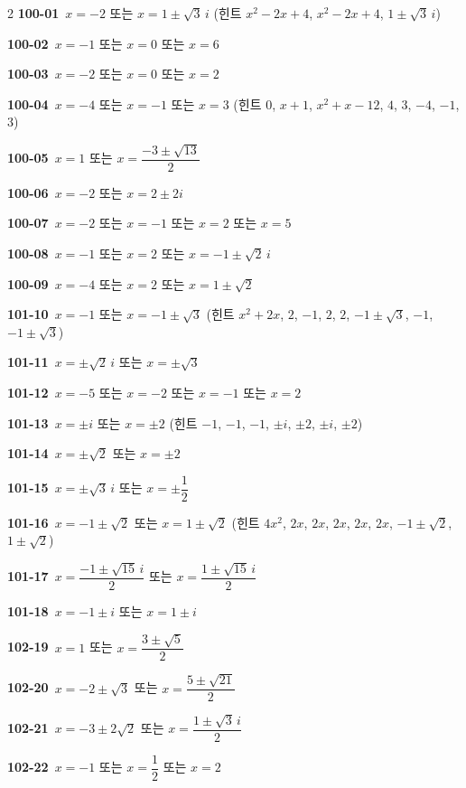 \documentclass[10pt,a4paper]{article}
\begin{document}
\begin{multicols}{2}
\noindent\textbf{100-01}\ $x=-2$ 또는 $x=1\pm\sqrt{3}\,i$ (힌트 $x^2-2x+4$, $x^2-2x+4$, $1\pm\sqrt{3}\,i$)\par
\noindent\textbf{100-02}\ $x=-1$ 또는 $x=0$ 또는 $x=6$\par
\noindent\textbf{100-03}\ $x=-2$ 또는 $x=0$ 또는 $x=2$\par
\noindent\textbf{100-04}\ $x=-4$ 또는 $x=-1$ 또는 $x=3$ (힌트 $0$, $x+1$, $x^2+x-12$, $4$, $3$, $-4$, $-1$, $3$)\par
\noindent\textbf{100-05}\ $x=1$ 또는 $x=\dfrac{-3\pm\sqrt{13}}{2}$\par
\noindent\textbf{100-06}\ $x=-2$ 또는 $x=2\pm 2i$\par
\noindent\textbf{100-07}\ $x=-2$ 또는 $x=-1$ 또는 $x=2$ 또는 $x=5$\par
\noindent\textbf{100-08}\ $x=-1$ 또는 $x=2$ 또는 $x=-1\pm\sqrt{2}\,i$\par
\noindent\textbf{100-09}\ $x=-4$ 또는 $x=2$ 또는 $x=1\pm\sqrt{2}$\par
\noindent\textbf{101-10}\ $x=-1$ 또는 $x=-1\pm\sqrt{3}$ (힌트 $x^2+2x$, $2$, $-1$, $2$, $2$, $-1\pm\sqrt{3}$, $-1$, $-1\pm\sqrt{3}$)\par
\noindent\textbf{101-11}\ $x=\pm\sqrt{2}\,i$ 또는 $x=\pm\sqrt{3}$\par
\noindent\textbf{101-12}\ $x=-5$ 또는 $x=-2$ 또는 $x=-1$ 또는 $x=2$\par
\noindent\textbf{101-13}\ $x=\pm i$ 또는 $x=\pm 2$ (힌트 $-1$, $-1$, $-1$, $\pm i$, $\pm 2$, $\pm i$, $\pm 2$)\par
\noindent\textbf{101-14}\ $x=\pm\sqrt{2}$ 또는 $x=\pm 2$\par
\noindent\textbf{101-15}\ $x=\pm\sqrt{3}\,i$ 또는 $x=\pm\dfrac{1}{2}$\par
\noindent\textbf{101-16}\ $x=-1\pm\sqrt{2}$ 또는 $x=1\pm\sqrt{2}$ (힌트 $4x^2$, $2x$, $2x$, $2x$, $2x$, $2x$, $-1\pm\sqrt{2}$, $1\pm\sqrt{2}$)\par
\noindent\textbf{101-17}\ $x=\dfrac{-1\pm\sqrt{15}\,i}{2}$ 또는 $x=\dfrac{1\pm\sqrt{15}\,i}{2}$\par
\noindent\textbf{101-18}\ $x=-1\pm i$ 또는 $x=1\pm i$\par
\noindent\textbf{102-19}\ $x=1$ 또는 $x=\dfrac{3\pm\sqrt{5}}{2}$\par
\noindent\textbf{102-20}\ $x=-2\pm\sqrt{3}$ 또는 $x=\dfrac{5\pm\sqrt{21}}{2}$\par
\noindent\textbf{102-21}\ $x=-3\pm 2\sqrt{2}$ 또는 $x=\dfrac{1\pm\sqrt{3}\,i}{2}$\par
\noindent\textbf{102-22}\ $x=-1$ 또는 $x=\dfrac{1}{2}$ 또는 $x=2$\par

\end{multicols}
\end{document}
